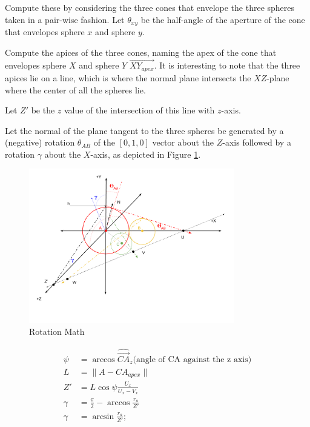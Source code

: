 \documentclass{article}
\begin{document}
Compute these by considering the three cones that envelope the three spheres
taken in a pair-wise fashion. Let $\theta_{xy}$ be the half-angle of the
aperture of the cone that envelopes sphere $x$ and sphere $y$.

Compute the apices of the three cones, naming the apex of the cone that
envelopes sphere $X$ and sphere $Y$ $\overrightarrow{XY_{apex}}$. It is interesting
to note that the three apices lie on a line, which is where the normal plane
intersects the $XZ$-plane where the center of all the spheres lie.

Let $Z'$ be the $z$ value of the intersection of this line with $z$-axis.

Let the normal of the plane tangent to the three spheres be generated
by a (negative) rotation $\theta_{AB}$ of the $[0,1,0]$ vector about the $Z$-axis followed by a rotation $\gamma$
about the $X$-axis, as depicted in Figure \ref{fig:rotation}.

\begin{figure}
     \centering
     \includegraphics[width=0.80\textwidth]{figures/RotationMath.png}
     \caption{Rotation Math}
  \label{fig:rotation}
\end{figure}


\begin{align}
  \psi &= \arccos{\hat{\overrightarrow{CA}}_z } \text{(angle of CA against the z axis)} \\
  L &= \| A - CA_{apex} \| \\
  Z' &= L \cos{\psi} \frac{U_x}{U_x-V_x} \\
  \gamma &= \frac{\pi}{2} - \arccos{\frac{r_a}{Z'}}\\
  \gamma &= \arcsin{\frac{r_a}{Z'}};
\end{align}
\end{document}

